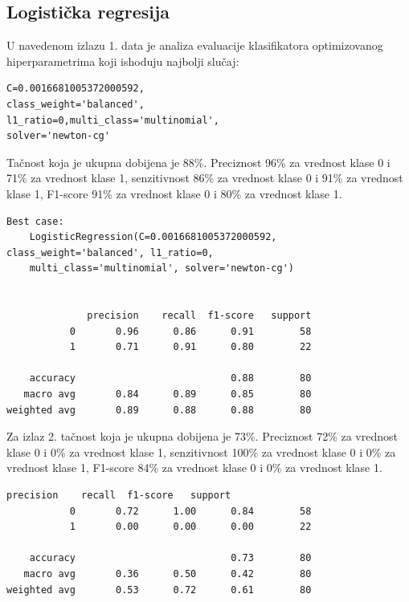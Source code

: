 \documentclass[fontsize=12bp, paper=a4]{scrarticle}
\begin{document}
\subsection{Logistička regresija}
U navedenom izlazu 1. data je analiza evaluacije klasifikatora 
 optimizovanog hiperparametrima koji ishoduju najbolji slučaj:

\begin{verbatim}
C=0.0016681005372000592, 
class_weight='balanced', 
l1_ratio=0,multi_class='multinomial', 
solver='newton-cg'
\end{verbatim}    

Tačnost koja je ukupna dobijena je 88\%. Preciznost 96\% za vrednost klase 0 i 71\% za vrednost klase 1, senzitivnost 86\% za vrednost klase 0 i 91\% za vrednost klase 1, F1-score 91\% za vrednost klase 0 i 80\% za vrednost klase 1.


\begin{lstlisting}[caption=Logistička regresija sa optimizacijom hiperparametara]
    Best case:
    LogisticRegression(C=0.0016681005372000592, class_weight='balanced', l1_ratio=0,
    multi_class='multinomial', solver='newton-cg')
    

              precision    recall  f1-score   support
           0       0.96      0.86      0.91        58
           1       0.71      0.91      0.80        22

    accuracy                           0.88        80
   macro avg       0.84      0.89      0.85        80
weighted avg       0.89      0.88      0.88        80
\end{lstlisting}

   

Za izlaz 2. tačnost koja je ukupna dobijena je 73\%. Preciznost 72\% za vrednost klase 0 i 0\% za vrednost klase 1, senzitivnost 100\% za vrednost klase 0 i 0\% za vrednost klase 1, F1-score 84\% za vrednost klase 0 i 0\% za vrednost klase 1.

\begin{lstlisting}[caption=Logistička regresija bez optimizacije hiperparametara]
              precision    recall  f1-score   support
           0       0.72      1.00      0.84        58
           1       0.00      0.00      0.00        22

    accuracy                           0.73        80
   macro avg       0.36      0.50      0.42        80
weighted avg       0.53      0.72      0.61        80
\end{lstlisting}
\end{document}
